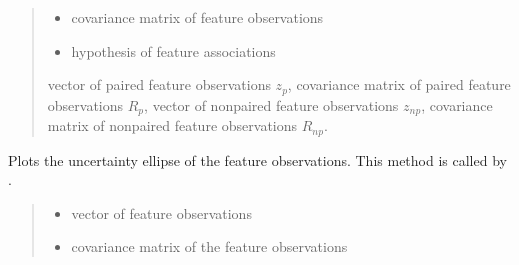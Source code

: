 \documentclass[letterpaper,10pt,english]{sphinxmanual}
\begin{document}
\begin{fulllineitems}
\begin{fulllineitems}
\begin{quote}
\begin{description}
\begin{itemize}
\item {} 
\sphinxAtStartPar
{} \textendash{} covariance matrix of feature observations

\item {} 
\sphinxAtStartPar
{} \textendash{} hypothesis of feature associations

\end{itemize}

\sphinxAtStartPar
vector of paired feature observations \(z_p\), covariance matrix of paired feature observations \(R_p\), vector of non\sphinxhyphen{}paired feature observations \(z_{np}\), covariance matrix of non\sphinxhyphen{}paired feature observations \(R_{np}\).

\end{description}\end{quote}

\end{fulllineitems}


\begin{fulllineitems}
\label{\detokenize{FEKFMBLocalization:FEKFMBL.FEKFMBL.PlotFeatureObservationUncertainty}}
\pysigstartsignatures
{}
\pysigstopsignatures
\sphinxAtStartPar
Plots the uncertainty ellipse of the feature observations. This method is called by {\hyperref[\detokenize{FEKFMBLocalization:FEKFMBL.FEKFMBL.PlotUncertainty}]{}}.
\begin{quote}\begin{description}
\begin{itemize}
\item {} 
\sphinxAtStartPar
{} \textendash{} vector of feature observations

\item {} 
\sphinxAtStartPar
{} \textendash{} covariance matrix of the feature observations

\end{itemize}


\end{description}
\end{quote}
\end{fulllineitems}
\end{fulllineitems}
\end{document}

